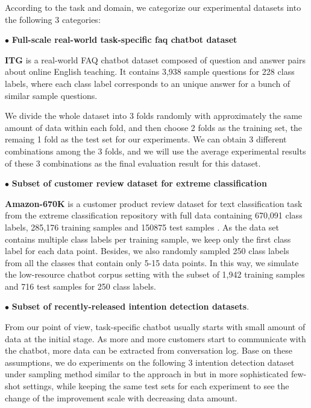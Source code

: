 \documentclass[letterpaper]{article} %
\begin{document}
  According to the task and domain, we categorize our experimental datasets into
  the following 3 categories:

  $\bullet$ \textbf{Full-scale real-world task-specific faq chatbot dataset}

  \textbf{ITG}  is  a  real-world  FAQ  chatbot dataset composed of question and
  answer pairs about online English teaching. It contains 3,938 sample questions
  for  228  class labels, where each class label corresponds to an unique answer
  for a bunch of similar sample questions.

  We  divide the whole dataset into 3 folds randomly with approximately the same
  amount  of data within each fold, and then choose 2 folds as the training set,
  the  remaing  1  fold  as  the  test  set for our experiments. We can obtain 3
  different  combinations  among  the  3  folds,  and  we  will  use the average
  experimental  results  of  these 3 combinations as the final evaluation result
  for this dataset.

  $\bullet$ \textbf{Subset of customer review dataset for extreme classification}

  \textbf{Amazon-670K}   is   a   customer   product  review  dataset  for  text
  classification  task from the extreme classification repository with full data
  containing  670,091  class  labels,  285,176  training samples and 150875 test
  samples \cite{bhatia2016extreme}.  As  the  data  set  contains  multiple class
  labels  per  training sample, we keep only the first class label for each data
  point. Besides, we also randomly sampled 250 class labels from all the classes
  that  contain only 5-15 data points. In this way, we simulate the low-resource
  chatbot  corpus setting with the subset of 1,942 training samples and 716 test
  samples for 250 class labels.

  $\bullet$ \textbf{Subset of recently-released intention detection datasets}.

  From our point of view, task-specific chatbot usually starts with small amount
  of  data at the initial stage. As more and more customers start to communicate
  with  the  chatbot,  more data can be extracted from conversation log. Base on
  these  assumptions,  we  do  experiments  on  the following 3 intention detection
  dataset    under    sampling    method    similar    to    the   approach   in
   \cite{casanueva2020efficient}  but  in  more  sophisticated few-shot settings,
  while  keeping the same test sets for each experiment to see the change of the
  improvement scale with decreasing data amount.
\end{document}
